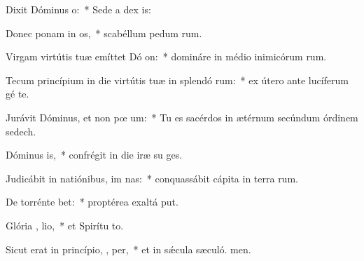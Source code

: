 \item Dixit Dóminus  o:~* Sede a dex is:
\item Donec ponam in os,~* scabéllum pedum rum.
\item Virgam virtútis tuæ emíttet Dó  on:~* domináre in médio inimicórum rum.
\item Tecum princípium in die virtútis tuæ in splendó rum:~* ex útero ante lucíferum gé te.
\item Jurávit Dóminus, et non pœ um:~* Tu es sacérdos in ætérnum secúndum órdinem sedech.
\item Dóminus   is,~* confrégit in die iræ su ges.
\item Judicábit in natiónibus, im nas:~* conquassábit cápita in terra rum.
\item De torrénte   bet:~* proptérea exaltá put.
\item Glória ,  lio,~* et Spirítu to.
\item Sicut erat in princípio,  ,  per,~* et in sǽcula sæculó. men.
